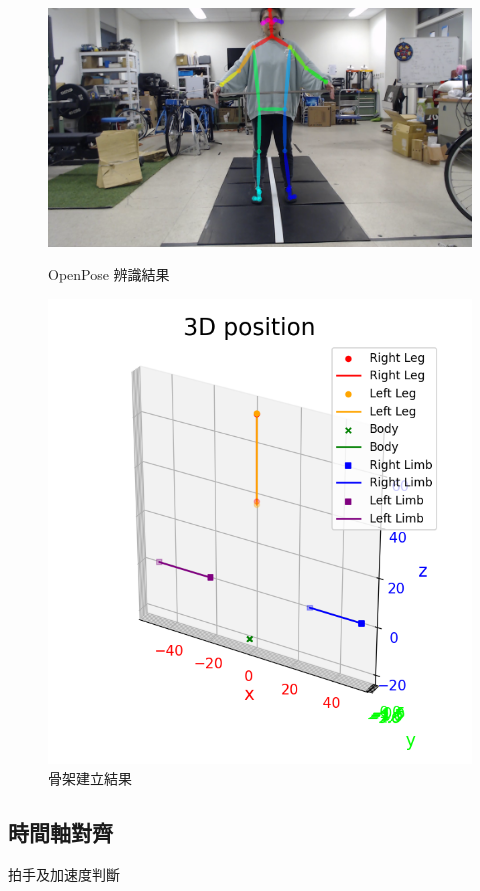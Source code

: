 \begin{figure}[!ht]
   \centering
   \begin{minipage}{.5\textwidth}
     \centering
     \includegraphics[width=.8\linewidth]{figure/ch3_fig_OpenPose_result.png}
     \caption[OpenPose 辨識結果]{OpenPose 辨識結果}
     \label{ch3_fig_OpenPose_result}
   \end{minipage}%
   \begin{minipage}{.5\textwidth}
     \centering
     \includegraphics[width=.8\linewidth]{figure/ch3_fig_my_skeleton.png}
     \caption[骨架建立結果]{骨架建立結果}
     \label{ch3_fig_my_skeleton}
   \end{minipage}
\end{figure}

\subsection{時間軸對齊}
拍手及加速度判斷

